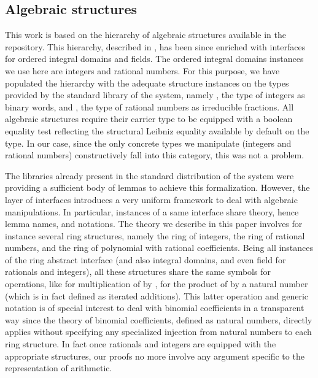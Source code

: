 \documentclass{mscs}
\begin{document}
\subsection{Algebraic structures}

This work is based on the hierarchy of algebraic structures available
in the \ssr{} repository. This hierarchy, described in \cite{hieralg},
has been since enriched with interfaces for ordered integral
domains and fields. The ordered integral domains instances we use here are
integers and rational numbers. For this purpose, we have populated the
hierarchy with the adequate structure instances on the types provided
by the standard library of the \Coq{} system, namely , the type
of integers as binary words, and , the type of rational numbers
as irreducible fractions. All \ssr{} algebraic
structures require their carrier type to be equipped with a boolean
equality test reflecting the structural Leibniz equality available by
default on the type. In our case, since the only concrete types
we manipulate (integers and rational numbers) constructively fall into
this category, this was not a problem.

The libraries already present in the standard distribution of the
system were providing a sufficient body of lemmas to achieve this
formalization. However, the \ssr{} layer of interfaces introduces a very
uniform framework to deal with algebraic manipulations.   In particular,
instances of a same interface share theory, hence lemma names, and
notations.  The theory we describe in this paper involves for instance
several ring structures, namely the ring of integers, the ring
of rational numbers, and the ring of polynomial with rational
coefficients. Being all instances of the ring abstract interface
(and also integral domains, and even field for rationals and integers), all
these structures share the same symbols for operations, like
 for multiplication of  by ,  for the
product of  by a natural number (which is in fact defined as
iterated additions).
This latter operation and generic notation is of special interest to
deal with binomial coefficients in a transparent way since the theory
of binomial coefficients, defined as natural numbers, directly applies
without specifying any specialized injection from natural numbers to
each ring structure. In fact once rationals and integers are equipped
with the appropriate structures, our proofs no more involve any
argument specific to the representation of arithmetic.
\end{document}
